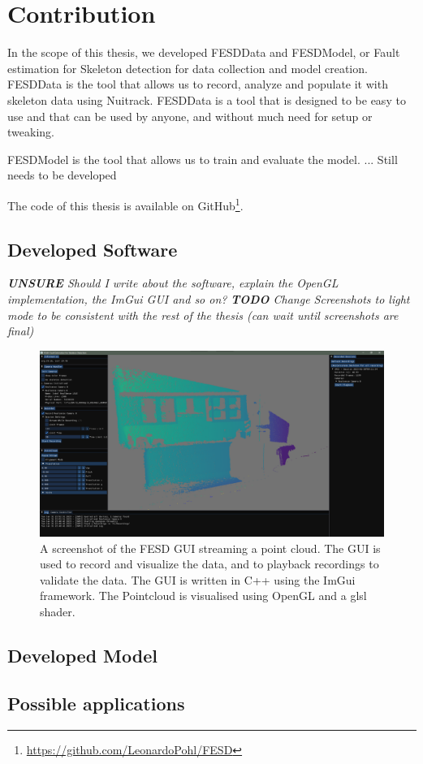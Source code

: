 \section{Contribution}
\label{sec:contribution}

In the scope of this thesis, we developed FESDData and FESDModel, or Fault estimation for Skeleton detection for data collection and model creation. FESDData is the tool that allows us to record, analyze and populate it with skeleton data using Nuitrack. FESDData is a tool that is designed to be easy to use and that can be used by anyone, and without much need for setup or tweaking.

FESDModel is the tool that allows us to train and evaluate the model. ... Still needs to be developed 

The code of this thesis is available on GitHub\footnote{\url{https://github.com/LeonardoPohl/FESD}}.

\subsection{Developed Software}

\textit{\textbf{UNSURE} Should I write about the software, explain the OpenGL implementation, the ImGui GUI and so on?}
\textit{\textbf{TODO} Change Screenshots to light mode to be consistent with the rest of the thesis (can wait until screenshots are final)}

\begin{figure}[ht]
  \centering
  \includegraphics[width=\linewidth]{figures/FESD/all.png}
  \caption[FESD GUI]{A screenshot of the FESD GUI streaming a point cloud. The GUI is used to record and visualize the data, and to playback recordings to validate the data. The GUI is written in C++ using the ImGui framework. The Pointcloud is visualised using OpenGL and a glsl shader.}
  \label{fig:stream_gui}
\end{figure}

\subsection{Developed Model}

\subsection{Possible applications}